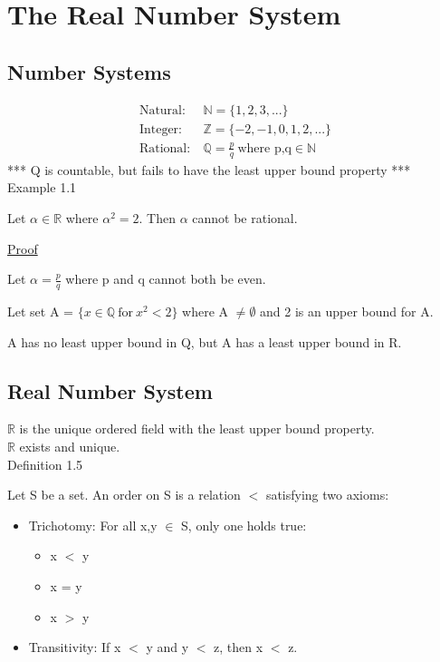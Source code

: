 \newpage
\section[Day 1: The Real Number System]{The Real Number System}

\subsection{Number Systems}

\begin{align*}
	\text{Natural}:\ & \mathbb{N} = \{1, 2, 3, ... \} \\
	\text{Integer}:\ & \mathbb{Z} = \{-2, -1, 0, 1, 2, ... \} \\
	\text{Rational}:\ & \mathbb{Q} = \frac{p}{q} \ \text{where p,q} \in \mathbb{N}
\end{align*}
*** Q is countable, but fails to have the least upper bound property *** \\

{ \color{red} Example 1.1 }

\qquad Let $ \alpha \in \mathbb{R} $ where $ \alpha^2 = 2 $. Then $ \alpha $ cannot be rational.

{ \color{magenta} \underline{Proof} }

Let $ \alpha = \frac{p}{q} $ where p and q cannot both be even.

Let set A = $\{ x \in \mathbb{Q} \ \text{for} \ x^2 < 2 \} $ where A $ \neq \emptyset $
and 2 is an upper bound for A.

A has no least upper bound in Q, but A has a least upper bound in R.

\subsection{Real Number System}

$ \mathbb{R} $ is the unique ordered field with the least upper bound property. \\
$ \mathbb{R} $ exists and unique. \\

{ \color{blue} Definition 1.5 }

\qquad Let S be a set. An order on S is a relation $<$ satisfying two axioms:

\begin{itemize}
	\item Trichotomy: For all x,y $ \in $ S, only one holds true:
		\begin{itemize}
			\item x $<$ y
			\item x = y
			\item x $>$ y
		\end{itemize}
	\item Transitivity: If x $<$ y and y $<$ z, then x $<$ z.
\end{itemize}

